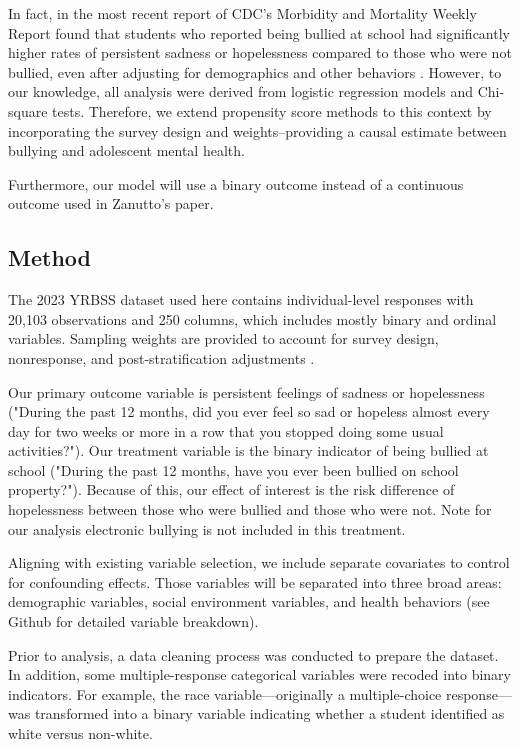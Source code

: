 \documentclass[12pt]{article}
\begin{document}
In fact, in the most recent report of CDC's Morbidity and Mortality Weekly Report found that students who reported being bullied at school had significantly higher rates of persistent sadness or hopelessness compared to those who were not bullied, even after adjusting for demographics and other behaviors \cite{cdc_mmwrr_2024}. However, to our knowledge, all analysis were derived from logistic regression models and Chi-square tests. Therefore, we extend propensity score methods to this context by incorporating the survey design and weights--providing a causal estimate between bullying and adolescent mental health.

Furthermore, our model will use a binary outcome instead of a continuous outcome used in Zanutto's paper.

\subsection{Method}

The 2023 YRBSS dataset used here contains individual-level responses with 20,103 observations and 250 columns, which includes mostly binary and ordinal variables. Sampling weights are provided to account for survey design, nonresponse, and post-stratification adjustments \cite{cdc_mmwrr_2024}.

Our primary outcome variable is persistent feelings of sadness or hopelessness ("During the past 12 months, did you ever feel so sad or hopeless almost every day for two weeks or more in a row that you stopped doing some usual activities?"). Our treatment variable is the binary indicator of being bullied at school ("During the past 12 months, have you ever been bullied on school property?"). Because of this, our effect of interest is the risk difference of hopelessness between those who were bullied and those who were not. Note for our analysis electronic bullying is not included in this treatment.

Aligning with existing variable selection, we include separate covariates to control for confounding effects. Those variables will be separated into three broad areas: demographic variables, social environment variables, and health behaviors (see Github for detailed variable breakdown).

Prior to analysis, a data cleaning process was conducted to prepare the dataset. In addition, some multiple-response categorical variables were recoded into binary indicators. For example, the race variable—originally a multiple-choice response—was transformed into a binary variable indicating whether a student identified as white versus non-white.
\end{document}
